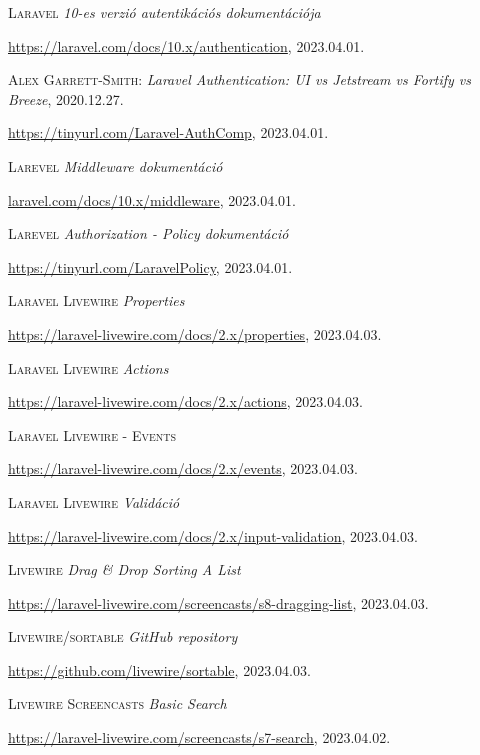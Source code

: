 \documentclass[
]{thesis-ekf}
\theoremstyle{definition}
\theoremstyle{remark}
\begin{document}
\begin{thebibliography}{2}
		\textsc{Laravel} \emph{10-es verzió autentikációs dokumentációja}
		
		\url{https://laravel.com/docs/10.x/authentication}, 2023.04.01.

		\textsc{Alex Garrett-Smith}: \emph{Laravel Authentication: UI vs      Jetstream vs Fortify vs Breeze}, 2020.12.27.
		
		\url{https://tinyurl.com/Laravel-AuthComp}, 2023.04.01.

		\textsc{Larevel} \emph{Middleware dokumentáció} 
		
		\url{laravel.com/docs/10.x/middleware}, 2023.04.01.
  
		\textsc{Larevel} \emph{Authorization - Policy dokumentáció} 
		
		\url{https://tinyurl.com/LaravelPolicy}, 2023.04.01.

		\textsc{Laravel Livewire} \emph{Properties} 
		
		\url{https://laravel-livewire.com/docs/2.x/properties}, 2023.04.03.

		\textsc{Laravel Livewire} \emph{Actions} 
		
		\url{https://laravel-livewire.com/docs/2.x/actions}, 2023.04.03.

		\textsc{Laravel Livewire - Events} 
		
		\url{https://laravel-livewire.com/docs/2.x/events}, 2023.04.03.

		\textsc{Laravel Livewire} \emph{Validáció} 
		
		\url{https://laravel-livewire.com/docs/2.x/input-validation}, 2023.04.03.

		\textsc{Livewire} \emph{ Drag \& Drop Sorting A List} 
		
		\url{https://laravel-livewire.com/screencasts/s8-dragging-list}, 2023.04.03.

		\textsc{Livewire/sortable} \emph{GitHub repository} 
		
		\url{https://github.com/livewire/sortable}, 2023.04.03.

		\textsc{Livewire Screencasts}  \emph{Basic Search} 
		
		\url{https://laravel-livewire.com/screencasts/s7-search}, 2023.04.02.



\end{thebibliography}
\end{document}
